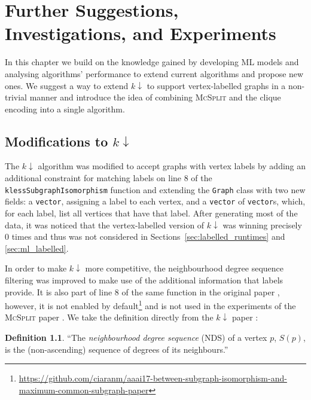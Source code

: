 \documentclass{l4proj}
\theoremstyle{definition}
\newtheorem{definition}{Definition}[chapter]
\theoremstyle{remark}
\begin{document}
\chapter{Further Suggestions, Investigations, and Experiments} \label{chapter:further}

In this chapter we build on the knowledge gained by developing ML models and
analysing algorithms' performance to extend current algorithms and propose new
ones. We suggest a way to extend $k{\downarrow}$ to support vertex-labelled
graphs in a non-trivial manner and introduce the idea of combining
\textsc{McSplit} and the clique encoding into a single algorithm.

\section{Modifications to \texorpdfstring{$k{\downarrow}$}{kdown}}

The $k{\downarrow}$ algorithm was modified to accept graphs with vertex
labels by adding an additional constraint for matching labels on line 8 of the
\texttt{klessSubgraphIsomorphism} function \cite{DBLP:conf/aaai/HoffmannMR17}
and extending the \texttt{Graph} class with two new fields: a \texttt{vector},
assigning a label to each vertex, and a \texttt{vector} of \texttt{vector}s,
which, for each label, list all vertices that have that label. After generating
most of the data, it was noticed that the vertex-labelled version of
$k{\downarrow}$ was winning precisely 0 times and thus was not considered in
Sections~\ref{sec:labelled_runtimes} and \ref{sec:ml_labelled}.

In order to make $k{\downarrow}$ more competitive, the neighbourhood degree
sequence filtering was improved to make use of the additional information that
labels provide. It is also part of line 8 of the same function in the original
paper \cite{DBLP:conf/aaai/HoffmannMR17}, however, it is not enabled by
default\footnote{\url{https://github.com/ciaranm/aaai17-between-subgraph-isomorphism-and-maximum-common-subgraph-paper}}
and is not used in the experiments of the \textsc{McSplit} paper
\cite{DBLP:conf/ijcai/McCreeshPT17}. We take the definition directly from the
$k{\downarrow}$ paper \cite{DBLP:conf/aaai/HoffmannMR17}:

\begin{definition}
  ``The \emph{neighbourhood degree sequence} (NDS) of a vertex $p$, $S(p)$, is the
  (non-ascending) sequence of degrees of its neighbours.''
\end{definition}
\end{document}
